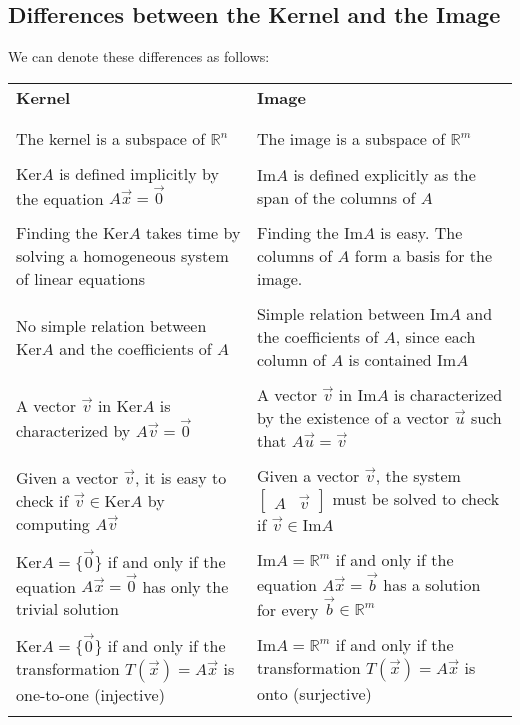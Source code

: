 \subsection{Differences between the Kernel and the Image}
We can denote these differences as follows:
\vskip0.3cm
\begin{center}
    \begin{tabular}{p{} | p{}}
        \\ {\centering \textbf{Kernel} \par} & {\centering \textbf{Image} \par} \\ \\ \hline \\
        The kernel is a subspace of $\mathbb{R}^n$ & The image is a subspace of $\mathbb{R}^m$ \\ \\
        $\text{Ker} A$ is defined implicitly by the equation $A\vec{x} = \vec{0}$ & $\text{Im} A$ is defined explicitly as the span of the columns of $A$ \\ \\
        Finding the $\text{Ker} A$ takes time by solving a homogeneous system of linear equations & Finding the $\text{Im} A$ is easy. The columns of $A$ form a basis for the image. \\ \\
        No simple relation between $\text{Ker} A$ and the coefficients of $A$ & Simple relation between $\text{Im} A$ and the coefficients of $A$, since each column of $A$ is contained $\text{Im} A$ \\ \\
        A vector $\vec{v}$ in $\text{Ker} A$ is characterized by $A\vec{v} = \vec{0}$ & A vector $\vec{v}$ in $\text{Im} A$ is characterized by the existence of a vector $\vec{u}$ such that $A\vec{u} = \vec{v}$ \\ \\
        Given a vector $\vec{v}$, it is easy to check if $\vec{v} \in \text{Ker} A$ by computing $A\vec{v}$ & Given a vector $\vec{v}$, the system $\begin{bmatrix}
            A & \vec{v}
        \end{bmatrix}$ must be solved to check if $\vec{v} \in \text{Im} A$ \\ \\
        $\text{Ker} A = \{\vec{0}\}$ if and only if the equation $A\vec{x} = \vec{0}$ has only the trivial solution & $\text{Im} A = \mathbb{R}^m$ if and only if the equation $A\vec{x} = \vec{b}$ has a solution for every $\vec{b} \in \mathbb{R}^m$ \\ \\
        $\text{Ker} A = \{\vec{0}\}$ if and only if the transformation $T(\vec{x}) = A\vec{x}$ is one-to-one (injective) & $\text{Im} A = \mathbb{R}^m$ if and only if the transformation $T(\vec{x}) = A\vec{x}$ is onto (surjective) \\ \\
    \end{tabular}
\end{center}

